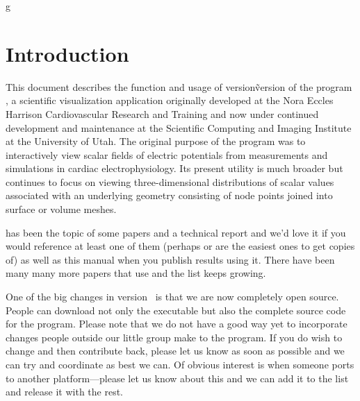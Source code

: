 g%
\section{Introduction}

This document describes the function and usage of version\~version{} of the
program \map{}, a scientific visualization application originally developed
at the Nora Eccles Harrison Cardiovascular Research and Training
 and now under
continued development and maintenance at the Scientific Computing and
Imaging Institute  at the
University of Utah.  The original purpose of the program was to
interactively view scalar fields of electric potentials from measurements
and simulations in cardiac electrophysiology.  Its present utility is much
broader but continues to focus on viewing three-dimensional distributions
of scalar values associated with an underlying geometry consisting of node
points joined into surface or volume meshes.

\map{} has been the topic of some papers
\cite{RSM:Mac92c,RSM:Mac92d,RSM:Mac93,RSM:Mac93a} and a technical report
\cite{RSM:Mac94d} and we'd love it if you would reference at least one of
them (perhaps \cite{RSM:Mac93} or \cite{RSM:Mac93a} are the easiest ones to
get copies of) as well as this manual when you publish results using it.
There have been many many more papers that use \map{} and the list keeps
growing.\cite{RSM:Mac93,RSM:Mac93a,RSM:Mac94d,RSM:Mac94c,RSM:Mac94f,RSM:Mac95d,RSM:Mac97,RSM:Mac98,RSM:Mac2000a,RSM:Mac2001,RSM:Pun98,RSM:Pun99,RSM:Tac92,RSM:Tac92b,RSM:Tac94,RSM:Tac96,RSM:Tac96b,RSM:Tac97b,RSM:Ni98,RSM:Ni99,RSM:Ni2000b,RSM:Lux96,RSM:Lux2001,RSM:Joh93b,RSM:Joh94,RSM:Joh94b,RSM:Pun2003,RSM:Ser2002}

One of the big changes in version~\version{} is that we are now completely
open source.  People can download not only the executable but also the
complete source code for the program.  Please note that we do not have a
good way yet to incorporate changes people outside our little group make
to the program.  If you do wish to change and then contribute back, please
let us know as soon as possible and we can try and coordinate as best we
can.  Of obvious interest is when someone ports \map{} to another
platform---please let us know about this and we can add it to the list and
release it with the rest.

